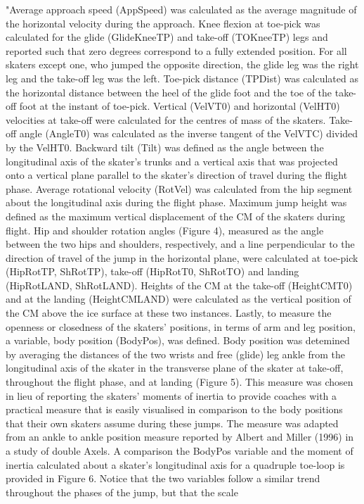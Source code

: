 \documentclass[12pt,journal,compsoc]{IEEEtran}
\begin{document}
"Average approach speed (AppSpeed) was calculated as the average magnitude of the horizontal velocity during the approach. Knee flexion at toe-pick
was calculated for the glide (GlideKneeTP) and take-off (TOKneeTP) legs and
reported such that zero degrees correspond to a fully extended position. For all skaters except one, who jumped the opposite direction, the glide leg was the right leg and the take-off leg was the left. Toe-pick distance (TPDist) was calculated as the horizontal distance between the heel of the glide foot and the toe of the take-off foot at the instant of toe-pick. Vertical (VelVT0) and horizontal (VelHT0) velocities at take-off were calculated for the centres of mass of the
skaters. Take-off angle (AngleT0) was calculated as the inverse tangent of the
VelVTC)
 divided by the VelHT0. Backward tilt (Tilt) was defined as the angle
between the longitudinal axis of the skater's trunks and a vertical axis that was
projected onto a vertical plane parallel to the skater's direction of travel during
the flight phase. Average rotational velocity (RotVel) was calculated from the
hip segment about the longitudinal axis during the flight phase. Maximum
jump height was defined as the maximum vertical displacement of the CM of
the skaters during flight. Hip and shoulder rotation angles (Figure 4), measured
as the angle between the two hips and shoulders, respectively, and a line perpendicular to the direction of travel of the jump in the horizontal plane, were calculated at toe-pick (HipRotTP, ShRotTP), take-off (HipRotT0, ShRotTO) and
landing (HipRotLAND, ShRotLAND). Heights of the CM at the take-off
(HeightCMT0) and at the landing (HeightCMLAND) were calculated as the vertical position of the CM above the ice surface at these two instances. Lastly, to
measure the openness or closedness of the skaters' positions, in terms of arm
and leg position, a variable, body position (BodyPos), was defined. Body position was detemined by averaging the distances of the two wrists and free (glide)
leg ankle from the longitudinal axis of the skater in the transverse plane of the
skater at take-off, throughout the flight phase, and at landing (Figure 5). This
measure was chosen in lieu of reporting the skaters' moments of inertia to provide coaches with a practical measure that is easily visualised in comparison to
the body positions that their own skaters assume during these jumps. The measure was adapted from an ankle to ankle position measure reported by Albert
and Miller (1996) in a study of double Axels. A comparison the BodyPos
variable and the moment of inertia calculated about a skater's longitudinal axis for a quadruple toe-loop is provided in Figure 6. Notice that the two variables follow a similar trend throughout the phases of the jump, but that the scale
\end{document}
